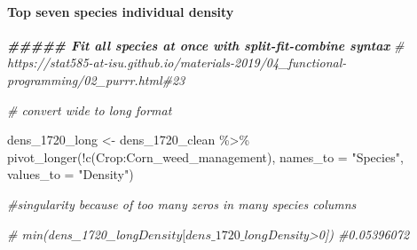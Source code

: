 \documentclass[
]{article}
\newenvironment{Shaded}{\begin{snugshade}}{\end{snugshade}}
\newcommand{\AttributeTok}[1]{\textcolor[rgb]{0.77,0.63,0.00}{#1}}
\newcommand{\CommentTok}[1]{\textcolor[rgb]{0.56,0.35,0.01}{\textit{#1}}}
\newcommand{\DocumentationTok}[1]{\textcolor[rgb]{0.56,0.35,0.01}{\textbf{\textit{#1}}}}
\newcommand{\FunctionTok}[1]{\textcolor[rgb]{0.00,0.00,0.00}{#1}}
\newcommand{\NormalTok}[1]{#1}
\newcommand{\OtherTok}[1]{\textcolor[rgb]{0.56,0.35,0.01}{#1}}
\newcommand{\SpecialCharTok}[1]{\textcolor[rgb]{0.00,0.00,0.00}{#1}}
\newcommand{\StringTok}[1]{\textcolor[rgb]{0.31,0.60,0.02}{#1}}
\begin{document}
\hypertarget{top-seven-species-individual-density}{%
\paragraph*{Top seven species individual density}\label{top-seven-species-individual-density}}

\begin{Shaded}
\begin{Highlighting}[]
\DocumentationTok{\#\#\#\#\# Fit all species at once with split{-}fit{-}combine syntax }
\CommentTok{\# https://stat585{-}at{-}isu.github.io/materials{-}2019/04\_functional{-}programming/02\_purrr.html\#23}


\CommentTok{\# convert wide to long format }

\NormalTok{dens\_1720\_long }\OtherTok{\textless{}{-}}\NormalTok{ dens\_1720\_clean }\SpecialCharTok{\%\textgreater{}\%} 
  \FunctionTok{pivot\_longer}\NormalTok{(}\SpecialCharTok{!}\FunctionTok{c}\NormalTok{(Crop}\SpecialCharTok{:}\NormalTok{Corn\_weed\_management), }
               \AttributeTok{names\_to =} \StringTok{"Species"}\NormalTok{, }\AttributeTok{values\_to =}  \StringTok{"Density"}\NormalTok{)}

\CommentTok{\#singularity because of too many zeros in many species columns }


\CommentTok{\# min(dens\_1720\_long$Density[dens\_1720\_long$Density\textgreater{}0]) \#0.05396072}


\end{Highlighting}
\end{Shaded}
\end{document}
